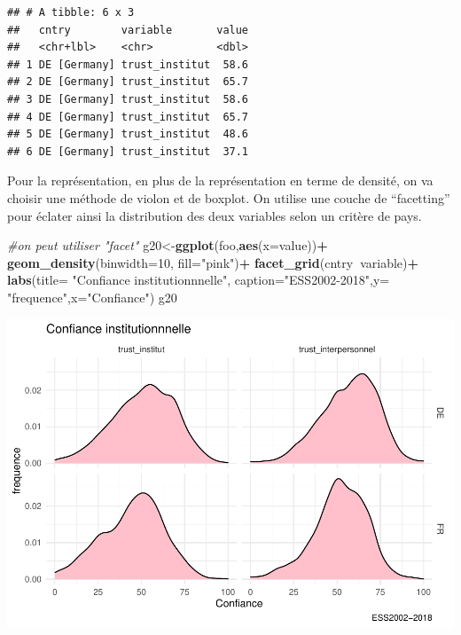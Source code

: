\documentclass[
]{book}
\newenvironment{Shaded}{\begin{snugshade}}{\end{snugshade}}
\newcommand{\CommentTok}[1]{\textcolor[rgb]{0.56,0.35,0.01}{\textit{#1}}}
\newcommand{\DataTypeTok}[1]{\textcolor[rgb]{0.13,0.29,0.53}{#1}}
\newcommand{\DecValTok}[1]{\textcolor[rgb]{0.00,0.00,0.81}{#1}}
\newcommand{\KeywordTok}[1]{\textcolor[rgb]{0.13,0.29,0.53}{\textbf{#1}}}
\newcommand{\NormalTok}[1]{#1}
\newcommand{\OperatorTok}[1]{\textcolor[rgb]{0.81,0.36,0.00}{\textbf{#1}}}
\newcommand{\StringTok}[1]{\textcolor[rgb]{0.31,0.60,0.02}{#1}}
\begin{document}
\begin{verbatim}
## # A tibble: 6 x 3
##   cntry        variable       value
##   <chr+lbl>    <chr>          <dbl>
## 1 DE [Germany] trust_institut  58.6
## 2 DE [Germany] trust_institut  65.7
## 3 DE [Germany] trust_institut  58.6
## 4 DE [Germany] trust_institut  65.7
## 5 DE [Germany] trust_institut  48.6
## 6 DE [Germany] trust_institut  37.1
\end{verbatim}

Pour la représentation, en plus de la représentation en terme de densité, on va choisir une méthode de violon et de boxplot. On utilise une couche de ``facetting'' pour éclater ainsi la distribution des deux variables selon un critère de pays.

\begin{Shaded}
\begin{Highlighting}[]
\CommentTok{#on peut utiliser "facet"}
\NormalTok{g20<-}\KeywordTok{ggplot}\NormalTok{(foo,}\KeywordTok{aes}\NormalTok{(}\DataTypeTok{x=}\NormalTok{value))}\OperatorTok{+}\StringTok{ }\KeywordTok{geom_density}\NormalTok{(}\DataTypeTok{binwidth=}\DecValTok{10}\NormalTok{, }\DataTypeTok{fill=}\StringTok{"pink"}\NormalTok{)}\OperatorTok{+}\StringTok{ }\KeywordTok{facet_grid}\NormalTok{(cntry}\OperatorTok{~}\NormalTok{variable)}\OperatorTok{+}\StringTok{   }
\StringTok{  }\KeywordTok{labs}\NormalTok{(}\DataTypeTok{title=} \StringTok{"Confiance institutionnnelle"}\NormalTok{, }\DataTypeTok{caption=}\StringTok{"ESS2002-2018"}\NormalTok{,}\DataTypeTok{y=} \StringTok{"frequence"}\NormalTok{,}\DataTypeTok{x=}\StringTok{"Confiance"}\NormalTok{)}
\NormalTok{g20}
\end{Highlighting}
\end{Shaded}

\includegraphics{bookdown-demo_files/figure-latex/418-1.pdf}
\end{document}
